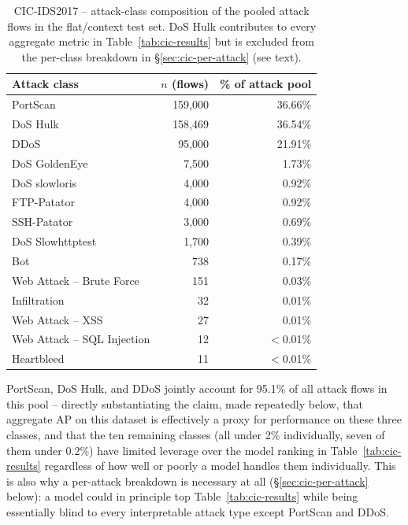 \begin{table}[h]
\centering
\begin{tabular}{@{}lrr@{}}
\toprule
Attack class & $n$ (flows) & \% of attack pool \\
\midrule
PortScan            & 159{,}000 & 36.66\% \\
DoS Hulk            & 158{,}469 & 36.54\% \\
DDoS                & 95{,}000  & 21.91\% \\
DoS GoldenEye       & 7{,}500   & 1.73\%  \\
DoS slowloris       & 4{,}000   & 0.92\%  \\
FTP-Patator         & 4{,}000   & 0.92\%  \\
SSH-Patator         & 3{,}000   & 0.69\%  \\
DoS Slowhttptest    & 1{,}700   & 0.39\%  \\
Bot                 & 738       & 0.17\%  \\
Web Attack -- Brute Force & 151 & 0.03\%  \\
Infiltration        & 32        & 0.01\%  \\
Web Attack -- XSS    & 27        & 0.01\%  \\
Web Attack -- SQL Injection & 12 & $<$0.01\% \\
Heartbleed          & 11        & $<$0.01\% \\
\bottomrule
\end{tabular}
\caption{CIC-IDS2017 -- attack-class composition of the pooled attack flows in the flat/context test set. DoS Hulk contributes to every aggregate metric in Table~\ref{tab:cic-results} but is excluded from the per-class breakdown in \S\ref{sec:cic-per-attack} (see text).}
\label{tab:cic-composition}
\end{table}

PortScan, DoS Hulk, and DDoS jointly account for 95.1\% of all attack flows in this pool -- directly substantiating the claim, made repeatedly below, that aggregate AP on this dataset is effectively a proxy for performance on these three classes, and that the ten remaining classes (all under 2\% individually, seven of them under 0.2\%) have limited leverage over the model ranking in Table~\ref{tab:cic-results} regardless of how well or poorly a model handles them individually. This is also why a per-attack breakdown is necessary at all (\S\ref{sec:cic-per-attack} below): a model could in principle top Table~\ref{tab:cic-results} while being essentially blind to every interpretable attack type except PortScan and DDoS.

